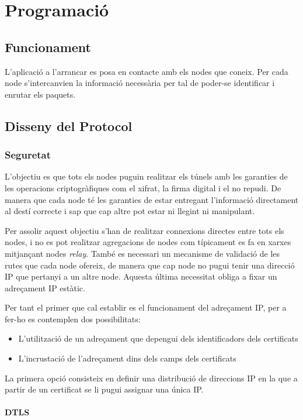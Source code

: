 \chapter{Programació}
\section{Funcionament}
L'aplicació a l'arrancar es posa en contacte amb els nodes que coneix. Per cada node s'intercanvien la informació necessària per tal de poder-se identificar i enrutar els paquets.
\section{Disseny del Protocol}
\subsection{Seguretat}
L'objectiu es que tots els nodes puguin realitzar els túnels amb les garanties de les operacions criptogràfiques com el xifrat, la firma digital i el no repudi. De manera que cada node té les garanties de estar entregant l'informació directament al destí correcte i sap que cap altre pot estar ni llegint ni manipulant.

Per assolir aquest objectiu s'han de realitzar connexions directes entre tots els nodes, i no es pot realitzar agregacions de nodes com típicament es fa en xarxes  mitjançant nodes \emph{relay}. També es necessari un mecanisme de validació de les rutes que cada node ofereix, de manera que cap node no pugui tenir una direcció IP que pertanyi a un altre node. Aquesta última necessitat obliga a fixar un adreçament IP estàtic.

Per tant el primer que cal establir es el funcionament del adreçament IP, per a fer-ho es contemplen dos possibilitats:
\begin{itemize}
\item L'utilització de un adreçament que depengui dels identificadors dels certificats
\item L'incrustació de l'adreçament dins dels camps dels certificats
\end{itemize}
La primera opció consisteix en definir una distribució de direccions IP en la que a partir de un certificat se li pugui assignar una única IP.

\subsubsection{DTLS}

